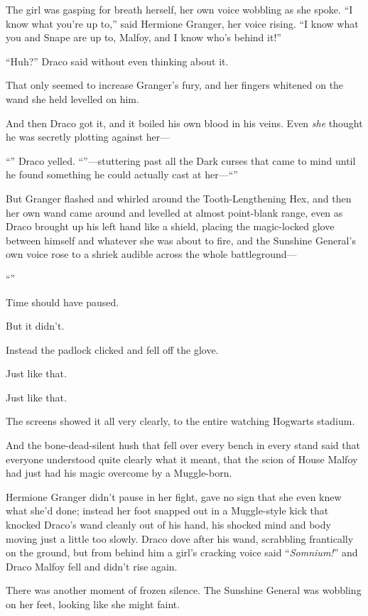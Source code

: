 The girl was gasping for breath herself, her own voice wobbling as she spoke. “I know what you’re up to,” said Hermione Granger, her voice rising. “I know what you and Snape are up to, Malfoy, and I know who’s behind it!”

“Huh?” Draco said without even thinking about it.

That only seemed to increase Granger’s fury, and her fingers whitened on the wand she held levelled on him.

And then Draco got it, and it boiled his own blood in his veins. Even \emph{she} thought he was secretly plotting against her—

“” Draco yelled. “”—stuttering past all the Dark curses that came to mind until he found something he could actually cast at her—“”

But Granger flashed and whirled around the Tooth-Lengthening Hex, and then her own wand came around and levelled at almost point-blank range, even as Draco brought up his left hand like a shield, placing the magic-locked glove between himself and whatever she was about to fire, and the Sunshine General’s own voice rose to a shriek audible across the whole battleground—

“”

Time should have paused.

But it didn’t.

Instead the padlock clicked and fell off the glove.

Just like that.

Just like that.

The screens showed it all very clearly, to the entire watching Hogwarts stadium.

And the bone-dead-silent hush that fell over every bench in every stand said that everyone understood quite clearly what it meant, that the scion of House Malfoy had just had his magic overcome by a Muggle-born.

Hermione Granger didn’t pause in her fight, gave no sign that she even knew what she’d done; instead her foot snapped out in a Muggle-style kick that knocked Draco’s wand cleanly out of his hand, his shocked mind and body moving just a little too slowly. Draco dove after his wand, scrabbling frantically on the ground, but from behind him a girl’s cracking voice said “\emph{Somnium!}” and Draco Malfoy fell and didn’t rise again.

There was another moment of frozen silence. The Sunshine General was wobbling on her feet, looking like she might faint.

